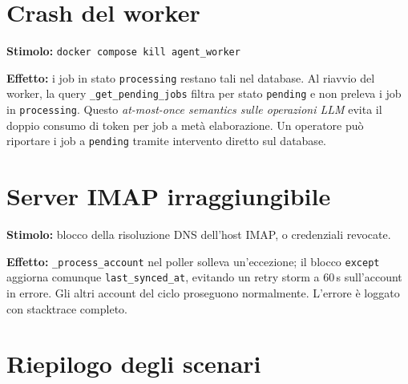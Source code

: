 \section{Crash del worker}
\label{sec:fail_worker_crash}

\textbf{Stimolo:} \texttt{docker compose kill agent\_worker}

\textbf{Effetto:} i job in stato \texttt{processing} restano tali nel database.
Al riavvio del worker, la query \texttt{\_get\_pending\_jobs} filtra per stato
\texttt{pending} e non preleva i job in \texttt{processing}. Questo
\emph{at-most-once semantics sulle operazioni LLM} evita il doppio consumo di token
per job a met\`a elaborazione. Un operatore pu\`o riportare i job a \texttt{pending}
tramite intervento diretto sul database.


\section{Server IMAP irraggiungibile}
\label{sec:fail_imap}

\textbf{Stimolo:} blocco della risoluzione DNS dell'host IMAP, o credenziali revocate.

\textbf{Effetto:} \texttt{\_process\_account} nel poller solleva un'eccezione; il
blocco \texttt{except} aggiorna comunque \texttt{last\_synced\_at}, evitando un
retry storm a 60\,s sull'account in errore. Gli altri account del ciclo proseguono
normalmente. L'errore \`e loggato con stacktrace completo.

\section{Riepilogo degli scenari}
\label{sec:fail_riepilogo}

